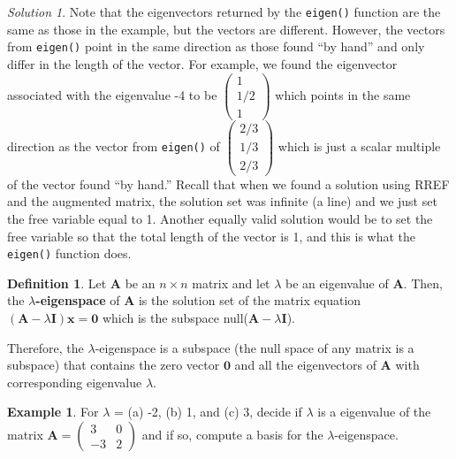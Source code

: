 \documentclass[
]{book}
\theoremstyle{definition}
\newtheorem{definition}{Definition}[chapter]
\theoremstyle{definition}
\newtheorem{example}{Example}[chapter]
\theoremstyle{definition}
\theoremstyle{definition}
\theoremstyle{remark}
\newtheorem*{solution}{Solution}
\begin{document}
\begin{solution}
Note that the eigenvectors returned by the \texttt{eigen()} function are the same as those in the example, but the vectors are different. However, the vectors from \texttt{eigen()} point in the same direction as those found ``by hand'' and only differ in the length of the vector. For example, we found the eigenvector associated with the eigenvalue -4 to be \(\begin{pmatrix} 1 \\ 1/2 \\ 1 \end{pmatrix}\) which points in the same direction as the vector from \texttt{eigen()} of \(\begin{pmatrix} 2/3 \\ 1/3 \\ 2/3 \end{pmatrix}\) which is just a scalar multiple of the vector found ``by hand.'' Recall that when we found a solution using RREF and the augmented matrix, the solution set was infinite (a line) and we just set the free variable equal to 1. Another equally valid solution would be to set the free variable so that the total length of the vector is 1, and this is what the \texttt{eigen()} function does.
\end{solution}

\begin{definition}
Let \(\mathbf{A}\) be an \(n \times n\) matrix and let \(\lambda\) be an eigenvalue of \(\mathbf{A}\). Then, the \textbf{\(\lambda\)-eigenspace} of \(\mathbf{A}\) is the solution set of the matrix equation \(\left( \mathbf{A} - \lambda \mathbf{I} \right) \mathbf{x} = \mathbf{0}\) which is the subspace null(\(\mathbf{A} - \lambda \mathbf{I}\)).
\end{definition}

Therefore, the \(\lambda\)-eigenspace is a subspace (the null space of any matrix is a subspace) that contains the zero vector \(\mathbf{0}\) and all the eigenvectors of \(\mathbf{A}\) with corresponding eigenvalue \(\lambda\).

\begin{example}
For \(\lambda\) = (a) -2, (b) 1, and (c) 3, decide if \(\lambda\) is a eigenvalue of the matrix \(\mathbf{A} = \begin{pmatrix} 3 & 0 \\ -3 & 2 \end{pmatrix}\) and if so, compute a basis for the \(\lambda\)-eigenspace.
\end{example}
\end{document}
